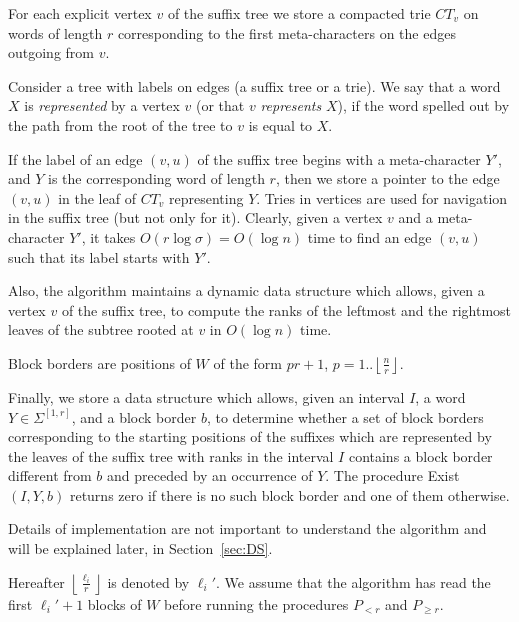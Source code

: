 \documentclass[10pt]{llncs}
\newcommand{\exist}{{\sc Exist}}
\begin{document}
For each explicit vertex $v$ of the suffix tree we store a compacted trie $CT_v$ on words of length $r$ corresponding to the first meta-characters on the edges outgoing from $v$.

\begin{definition}
   Consider a tree with labels on edges (a suffix tree or a trie). We say that a word $X$ is \emph{represented} by a vertex $v$ (or that $v$ \emph{represents} $X$), if the word spelled out by the path from the root of the tree to $v$ is equal to $X$.
\end{definition}

If the label of an edge $(v,u)$ of the suffix tree begins with a meta-character $Y'$, and $Y$ is the corresponding word of length $r$, then we store a pointer to the edge $(v,u)$ in the leaf of $CT_v$ representing $Y$. Tries in vertices are used for navigation in the suffix tree (but not only for it). Clearly, given a vertex $v$ and a meta-character $Y'$, it takes $O(r\log{\sigma}) = O(\log{n})$ time to find an edge $(v,u)$ such that its label starts with $Y'$.

Also, the algorithm maintains a dynamic data structure which allows, given a vertex $v$ of the suffix tree, to compute the ranks of the leftmost and the rightmost leaves of the subtree rooted at $v$ in $O(\log n)$ time. 

\begin{definition}
	Block borders are positions of $W$ of the form $pr + 1$, $p = 1..\left\lfloor\frac{n}{r}\right\rfloor$.
\end{definition}

Finally, we store a data structure which allows, given an interval $I$, a word $Y \in \Sigma^{[1,r]}$, and a block border $b$, to determine whether a set of block borders corresponding to the starting positions of the suffixes which are represented by the leaves of the suffix tree with ranks in the interval $I$ contains a block border different from $b$ and preceded by an occurrence of $Y$. The procedure \exist$(I, Y, b)$ returns zero if there is no such block border and one of them otherwise.

Details of implementation are not important to understand the algorithm and will be explained later, in Section~\ref{sec:DS}.

Hereafter $\left\lfloor\frac{\ell_i}{r}\right\rfloor$ is denoted by $\ell_i'$. We assume that the algorithm has read the first $\ell_i'+1$ blocks of $W$ before running the procedures $P_{<r}$ and $P_{\geq r}$.
\end{document}
